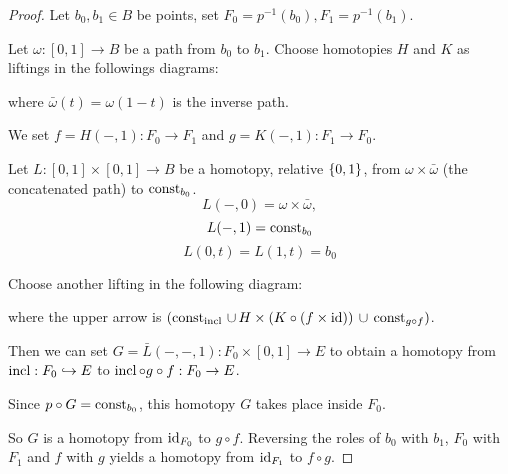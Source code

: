 \begin{proof}
Let $b_0,b_1\in B$ be points, set $F_0=p^{-1}(b_0),F_1=p^{-1}(b_1)$.

Let $\omega:[0,1]\to B$ be a path from $b_0$ to $b_1$. Choose homotopies $H$ and $K$ as liftings in the followings diagrams:
\begin{center}
\qquad
{}
\end{center}

where $\bar\omega(t)=\omega(1-t)$ is the inverse path.

We set $f=H(-,1):F_0\to F_1$ and $g=K(-,1):F_1\to F_0$.

Let $L:[0,1]\times[0,1]\to B$ be a homotopy, relative $\{0,1\}$, from $\omega\times\bar\omega$ (the concatenated path) to $\operatorname{const}_{b_0}$.
\[L(-,0)=\omega\times\bar\omega,\]
\[L(-,1)=\operatorname{const}_{b_0}\]
\[L(0,t)=L(1,t)=b_0\]

Choose another lifting in the following diagram:

\begin{center}
\end{center}
where the upper arrow is $(\operatorname{const}_{\operatorname{incl}}\,\cup\, H\times(K\circ(f\times\operatorname{id}))\,\cup\,\operatorname{const}_{g\circ f})$.\smallskip



\vspace{-0.1cm}
Then we can set $G=\bar L(-,-,1):F_0\times[0,1]\to E$ to obtain a homotopy from $\operatorname{incl}:F_0\hookrightarrow E$ to $\operatorname{incl}\circ g\circ f:F_0\to E$.

Since $p\circ G=\operatorname{const}_{b_0}$, this homotopy $G$ takes place inside $F_0$.

So $G$ is a homotopy from $\operatorname{id}_{F_0}$ to $g\circ f$. Reversing the roles of $b_0$ with $b_1$, $F_0$ with $F_1$ and $f$ with $g$ yields a homotopy from $\operatorname{id}_{F_1}$ to $f\circ g$.
\end{proof}

